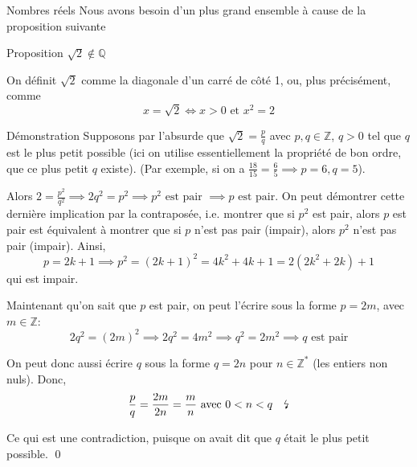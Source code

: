 \documentclass{article}
\begin{document}
\begin{parag}{Nombres réels}
    Nous avons besoin d'un plus grand ensemble à cause de la proposition suivante
    \begin{subparag}{Proposition}
        $\sqrt{2} \not\in \mathbb{Q}$

        On définit $\sqrt{2}$ comme la diagonale d'un carré de côté 1, ou, plus précisément, comme
        \[x = \sqrt{2} \iff x > 0 \text{ et } x^2 = 2\]
    \end{subparag}

    \begin{subparag}{Démonstration}
        Supposons par l'absurde que $\sqrt{2} = \frac{p}{q}$ avec $p, q \in \mathbb{Z}$, $q > 0$ tel que $q$ est le plus petit possible (ici on utilise essentiellement la propriété de bon ordre, que ce plus petit $q$ existe). (Par exemple, si on a $\frac{18}{15} = \frac{6}{5} \implies p = 6, q = 5$).

        Alors $2 = \frac{p^2}{q^2} \implies 2q^2 = p^2 \implies p^2 \text{ est pair } \implies p \text{ est pair}$. On peut démontrer cette dernière implication par la contraposée, i.e. montrer que si $p^{2}$ est pair, alors $p$ est pair est équivalent à montrer que si $p$ n'est pas pair (impair), alors $p^2$ n'est pas pair (impair). Ainsi,
        \[p = 2k + 1 \implies p^2 = \left(2k + 1\right)^2 = 4k^2 + 4k + 1 = 2\left(2k^2 + 2k\right) + 1\]
        qui est impair.

        Maintenant qu'on sait que $p$ est pair, on peut l'écrire sous la forme $p = 2m$, avec $m \in \mathbb{Z}$:
    \[2q^2 = \left(2m\right)^2 \implies 2q^2 = 4m^2 \implies q^2 = 2m^2 \implies q \text{ est pair}\]

    On peut donc aussi écrire $q$ sous la forme $q = 2n$ pour $n \in \mathbb{Z}^* $ (les entiers non nuls). Donc,
    \[\frac{p}{q} = \frac{2m}{2n} = \frac{m}{n} \text{ avec } 0 < n < q \quad\text{\lightning}\]

    Ce qui est une contradiction, puisque on avait dit que $q$ était le plus petit possible.
    \qed
    \end{subparag}
\end{parag}
\end{document}
